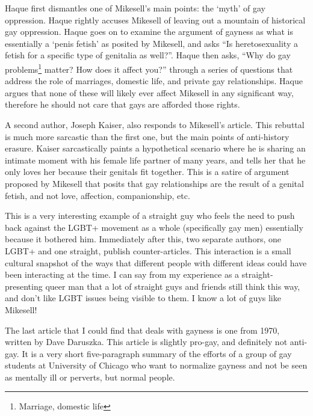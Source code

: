 \documentclass[a4paper,12pt]{article}
\begin{document}
	Haque first dismantles one of Mikesell's main points: the `myth' of gay oppression. Haque rightly accuses Mikesell of leaving out a mountain of historical gay oppression. Haque goes on to examine the argument of gayness as what is essentially a `penis fetish' as posited by Mikesell, and asks ``Is heretosexuality a fetish for a specific type of genitalia as well?''. Haque then asks, ``Why do gay problems\footnote{Marriage, domestic life} matter? How does it affect you?'' through a series of questions that address the role of marriages, domestic life, and private gay relationships. Haque argues that none of these will likely ever affect Mikesell in any significant way, therefore he should not care that gays are afforded those rights.
	
	A second author, Joseph Kaiser, also responds to Mikesell's article. \cite{counterantigay2} This rebuttal is much more sarcastic than the first one, but the main points of anti-history erasure. Kaiser sarcastically paints a hypothetical scenario where he is sharing an intimate moment with his female life partner of many years, and tells her that he only loves her because their genitals fit together. This is a satire of argument proposed by Mikesell that posits that gay relationships are the result of a genital fetish, and not love, affection, companionship, etc.

	This is a very interesting example of a straight guy who feels the need to push back against the LGBT+ movement as a whole (specifically gay men) essentially because it bothered him. Immediately after this, two separate authors, one LGBT+ and one straight, publish counter-articles. This interaction is a small cultural snapshot of the ways that different people with different ideas could have been interacting at the time. I can say from my experience as a straight-presenting queer man that a lot of straight guys and friends still think this way, and don't like LGBT issues being visible to them. I know a lot of guys like Mikesell!

	The last article that I could find that deals with gayness is one from 1970, written by Dave Daruszka.\cite{progayold} This article is slightly pro-gay, and definitely not anti-gay. It is a very short five-paragraph summary of the efforts of a group of gay students at University of Chicago who want to normalize gayness and not be seen as mentally ill or perverts, but normal people. 

\newpage
\end{document}
